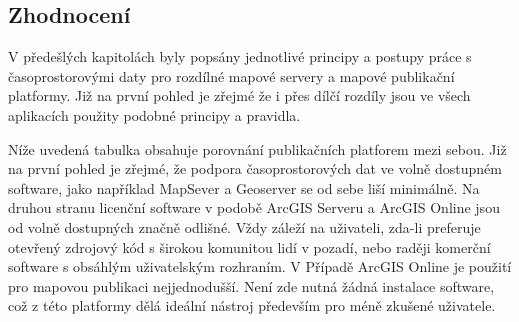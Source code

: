 \newpage
\subsection{Zhodnocení} V předešlých kapitolách byly popsány jednotlivé
principy a postupy práce s časoprostorovými daty pro rozdílné mapové
servery a mapové publikační platformy. Již na první pohled je zřejmé
že i přes dílčí rozdíly jsou ve všech aplikacích použity podobné
principy a pravidla.

Níže uvedená tabulka obsahuje porovnání publikačních platforem mezi 
sebou. Již na první pohled je zřejmé, že podpora časoprostorových dat ve 
volně dostupném software,
jako například MapSever a Geoserver se od sebe liší minimálně. Na 
druhou stranu licenční software v podobě ArcGIS Serveru a ArcGIS 
Online jsou od volně dostupných značně odlišné.
Vždy záleží na uživateli, zda-li preferuje otevřený zdrojový kód s širokou komunitou lidí v pozadí, nebo raději komerční software s obsáhlým uživatelským 
rozhraním. V Případě ArcGIS Online je 
použití pro mapovou publikaci nejjednodušší. Není zde nutná žádná 
instalace software, což z této platformy dělá ideální nástroj především 
pro méně zkušené uživatele.

